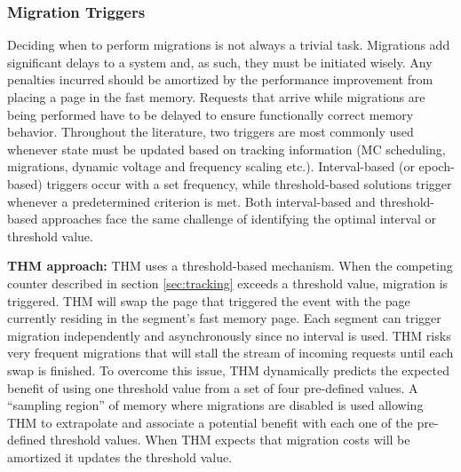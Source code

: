 \subsubsection{Migration Triggers}

Deciding when to perform migrations is not always a trivial task. Migrations add significant delays to a system and, as such, they must be initiated wisely. Any penalties incurred should be amortized by the performance improvement from placing a page in the fast memory. Requests that arrive while migrations are being performed have to be delayed to ensure functionally correct memory behavior. Throughout the literature, two triggers are most commonly used whenever state must be updated based on tracking information (MC scheduling, migrations, dynamic voltage and frequency scaling etc.). Interval-based (or epoch-based) triggers occur with a set frequency, while threshold-based solutions trigger whenever a predetermined criterion is met. 
Both interval-based and threshold-based approaches face the same challenge of identifying the optimal interval or threshold value. 


	\textbf{THM approach:} THM uses a threshold-based mechanism. When the competing counter described in section \ref{sec:tracking} exceeds a threshold value, migration is triggered. THM will swap the page that triggered the event with the page currently residing in the segment's fast memory page. Each segment can trigger migration independently and asynchronously since no interval is used. THM risks very frequent migrations that will stall the stream of incoming requests until each swap is finished. To overcome this issue, THM dynamically predicts the expected benefit of using one threshold value from a set of four pre-defined values. A ``sampling region'' of memory where migrations are disabled is used allowing THM to extrapolate and associate a potential benefit with each one of the pre-defined threshold values. When THM expects that migration costs will be amortized it updates the threshold value.
	
